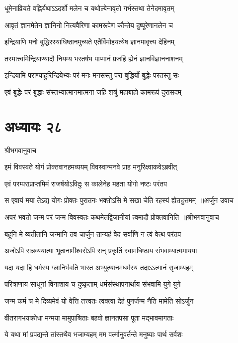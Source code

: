 \twolineshloka
{धूमेनाव्रियते वह्निर्यथाऽऽदर्शो मलेन च}
{यथोल्बेनावृतो गर्भस्तथा तेनेदमावृतम्}


\twolineshloka
{आवृतं ज्ञानमेतेन ज्ञानिनो नित्यवैरिणा}
{कामरूपेण कौन्तेय दुष्पूरेणानलेन च}


\twolineshloka
{इन्द्रियाणि मनो बुद्धिरस्याधिष्ठानमुच्यते}
{एतैर्विमोहयत्येष ज्ञानमावृत्त्य देहिनम्}


\twolineshloka
{तस्मात्त्वमिन्द्रियाण्यादौ नियम्य भरतर्षभ}
{पाप्मानं प्रजहि ह्येनं ज्ञानविज्ञाननाशनम्}


\twolineshloka
{इन्द्रियामि पराण्याहुरिन्द्रियेभ्यः परं मनः}
{मनसस्तु परा बुद्धिर्यो बुद्धेः परतस्तु सः}


\twolineshloka
{एवं बुद्धेः परं बुद्धाः संस्तभ्यात्मानमात्मना}
{जहि शत्रुं महाबाहो कामरूपं दुरासदम्}


\chapter{अध्यायः २८}
\twolineshloka
{श्रीभगवानुवाच}
{}


\twolineshloka
{इमं विवस्वते योगं प्रोक्तवानहमव्ययम्}
{विवस्वान्मनवे प्राह मनुरिक्ष्वाकवेऽब्रवीत्}


\twolineshloka
{एवं परम्पराप्राप्तमिमं राजर्षयोऽविदुः}
{स कालेनेह महता योगो नष्टः परंतप}


\threelineshloka
{स एवायं मया तेऽद्य योगः प्रोक्तः पुरातनः}
{भक्तोऽसि मे सखा चेति रहस्यं ह्येतदुत्तमम् ॥अर्जुन उवाच}
{}


\threelineshloka
{अपरं भवतो जन्म परं जन्म विवस्वतः}
{कथमेतद्विजानीयां त्वमादौ प्रोक्तवानिति ॥श्रीभगवानुवाच}
{}


\twolineshloka
{बहूनि मे व्यतीतानि जन्मानि तव चार्जुन}
{तान्यहं वेद सर्वाणि न त्वं वेत्थ परंतप}


\twolineshloka
{अजोऽपि सन्नव्ययात्मा भूतानामीश्वरोऽपि सन्}
{प्रकृतिं स्वामधिष्ठाय संभवाम्यात्ममायया}


\twolineshloka
{यदा यदा हि धर्मस्य ग्लानिर्भवति भारत}
{अभ्युत्थानमधर्मस्य तदाऽऽत्मानं सृजाम्यहम्}


\twolineshloka
{परित्राणाय साधूनां विनाशाय च दुष्कृताम्}
{धर्मसंस्थापनार्थाय संभवामि युगे युगे}


\twolineshloka
{जन्म कर्म च मे दिव्यमेवं यो वेत्ति तत्त्वतः}
{त्वक्त्वा देहं पुनर्जन्म नैति मामेति सोऽर्जुन}


\twolineshloka
{वीतरागभयक्रोधा मन्मया मामुपाश्रिताः}
{बहवो ज्ञानतपसा पूता मद्भावमागताः}


\twolineshloka
{ये यथा मां प्रपद्यन्ते तांस्तथैव भजाम्यहम्}
{मम वर्त्मानुवर्तन्ते मनुष्याः पार्थ सर्वशः}


